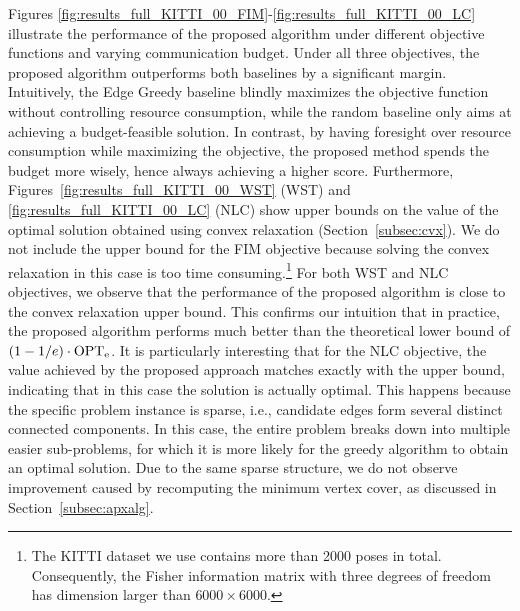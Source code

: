 \documentclass[conference]{IEEEtran}
\begin{document}
Figures \ref{fig:results_full_KITTI_00_FIM}-\ref{fig:results_full_KITTI_00_LC}
illustrate the performance of the proposed algorithm under
different objective functions and varying communication budget.
Under all three objectives, the proposed algorithm outperforms both
baselines by a significant margin. 
Intuitively, the Edge Greedy baseline blindly maximizes the objective function
without controlling resource consumption, while the random baseline only aims at
achieving a budget-feasible solution. In contrast, by having foresight over resource consumption while maximizing the objective, the proposed method spends the budget more wisely, hence always achieving a higher score. 
Furthermore, Figures~\ref{fig:results_full_KITTI_00_WST} (WST) and
\ref{fig:results_full_KITTI_00_LC} (NLC) show upper bounds on the value of the
optimal solution obtained using convex relaxation (Section~\ref{subsec:cvx}). 
We do not include the upper
bound for the FIM objective because solving the convex relaxation in this case
is too time consuming.\footnote{The KITTI dataset we use contains more than 2000
poses in total. Consequently, the Fisher information matrix with three degrees of
freedom has dimension larger than $6000 \times 6000$.} For both WST and NLC objectives, we
observe that the performance of the proposed algorithm is close to the convex
relaxation upper bound. This confirms our intuition that in practice, the proposed algorithm performs much better than the theoretical lower bound of $(1-1/e) \cdot \mathrm{OPT}_\text{e}$.
 It is particularly interesting that for the NLC objective, the value achieved by the proposed approach matches exactly with the upper bound, indicating that in
this case the solution is actually optimal. 
This happens because
the specific problem instance is sparse, i.e., candidate edges form several
distinct connected components.
In this case, the entire problem breaks down into
multiple easier sub-problems, for which it is more likely for the greedy
algorithm to obtain an optimal solution. 
Due to the same sparse structure, we do not observe improvement caused by recomputing the minimum vertex cover, 
as discussed in Section~\ref{subsec:apxalg}.
\end{document}
